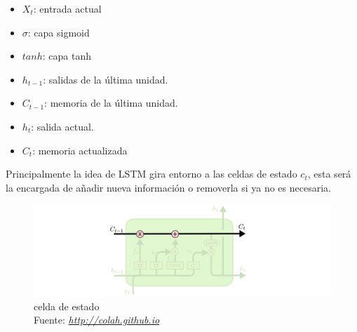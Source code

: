 \begin{itemize}
	\item $X_{t}$: entrada actual
	\item $\sigma$: capa sigmoid
	\item $tanh$: capa tanh
	\item $h_{t-1}$: salidas de la última unidad.
	\item $C_{t-1}$: memoria de la última unidad.
	\item $h_{t}$: salida actual.
	\item $C_{t}$: memoria actualizada
	
\end{itemize}


Principalmente la idea de LSTM gira entorno a las celdas de estado  $c_{t}$, esta será la encargada de añadir nueva información o removerla si ya no es necesaria.

\begin{figure}[H]
	\centering
	\includegraphics[width=1\textwidth]{Figures/kernel.png}
	\caption{celda de estado \\ Fuente:  \href{http://colah.github.io/posts/2015-08-Understanding-LSTMs/}{\textit{http://colah.github.io}}}
	\label{}
\end{figure}


